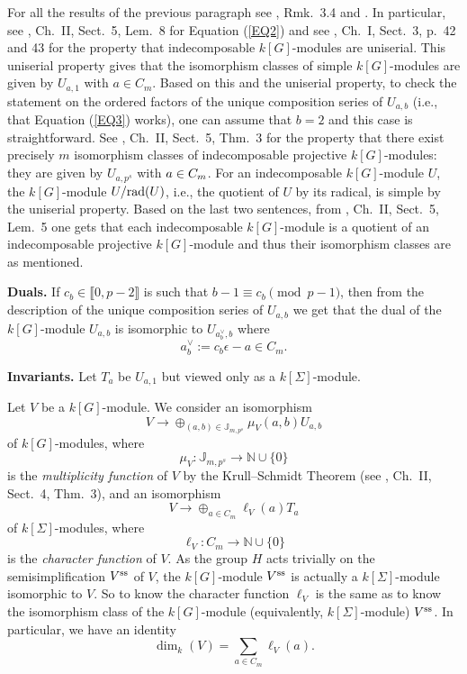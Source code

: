\documentclass[11pt]{amsart}
\def\ss{\textup{ss}}
\def\rad{\textup{rad}}
\begin{document}
For all the results of the previous paragraph see \cite{BCK}, Rmk.\ 3.4 and \cite{A}. In particular, see \cite{A}, Ch.\ II, Sect.\ 5, Lem.\ 8 for Equation (\ref{EQ2}) and see \cite{A}, Ch.\ I, Sect.\ 3, p.\ 42 and 43 for the property that indecomposable $k[G]$-modules are uniserial. This uniserial property gives that the isomorphism classes of simple $k[G]$-modules are given by $U_{a,1}$ with $a\in C_m$. Based on this and the uniserial property, to check the statement on the ordered factors of the unique composition series of $U_{a,b}$ (i.e., that Equation (\ref{EQ3}) works), one can assume that $b=2$ and this case is straightforward. See \cite{A}, Ch.\ II, Sect.\ 5, Thm.\ 3 for the property that there exist precisely $m$ isomorphism classes of indecomposable projective $k[G]$-modules: they are given by $U_{a,p^s}$ with $\break a\in C_m$. For an indecomposable $k[G]$-module $U$, the $k[G]$-module $U/\rad(U)$, i.e., the quotient of $U$ by its radical, is simple by the uniserial property. Based on the last two sentences, from \cite{A}, Ch.\ II, Sect.\ 5, Lem.\ 5 one gets that each indecomposable $k[G]$-module is a quotient of an indecomposable projective $k[G]$-module and thus their isomorphism classes are as mentioned.

{\bf Duals.} If $c_b\in\llbracket0,p-2\rrbracket$ is such that $b-1\equiv c_b\pmod{p-1}$, then from the description of the unique composition series of $U_{a,b}$ we get that the dual of the $k[G]$-module $U_{a,b}$ is isomorphic to $U_{a^{\vee}_b,b}$ where
$$a^{\vee}_b:=c_b\epsilon-a\in C_m.$$

{\bf Invariants.} Let $T_a$ be $U_{a,1}$ but viewed only as a $k[\Sigma]$-module.

Let $V$ be a $k[G]$-module. We consider an isomorphism
$$V\rightarrow \oplus_{(a,b)\in\mathbb J_{m,p^s}} \mu_V(a,b)U_{a,b}$$
of $k[G]$-modules, where 
$$\mu_V:\mathbb J_{m,p^s}\rightarrow\mathbb N\cup\{0\}$$
is the {\it multiplicity function} of $V$ by the Krull--Schmidt Theorem (see \cite{A}, Ch.\ II, Sect.\ 4, Thm.\ 3), and an isomorphism
$$V\rightarrow \oplus_{a\in C_m} \ell_V(a)T_{a}$$
of $k[\Sigma]$-modules, where 
$$\ell_V:C_m\rightarrow\mathbb N\cup\{0\}$$
is the {\it character function} of $V$. As the group $H$ acts trivially on the semisimplification $V^{\ss}$ of $V$, the $k[G]$-module $V^{\ss}$ is actually a $k[\Sigma]$-module isomorphic to $V$. So to know the character function $\ell_V$ is the same as to know the isomorphism class of the $k[G]$-module (equivalently, $k[\Sigma]$-module) $V^{\ss}$. In particular, we have an identity
\begin{equation}\label{EQ5}
\dim_k(V)=\sum_{a\in C_m} \ell_V(a).
\end{equation}
\end{document}
